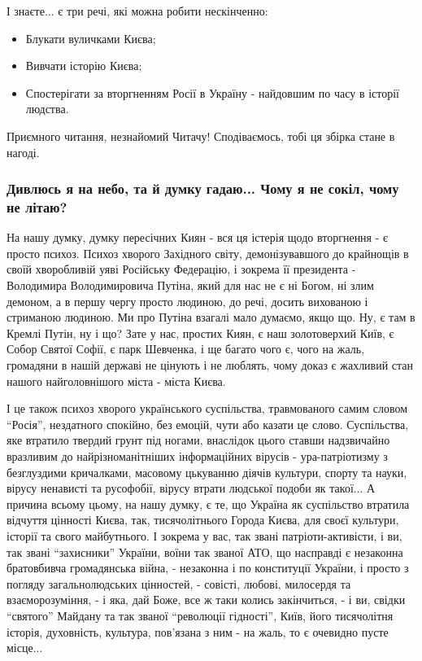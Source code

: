 І знаєте... є три речі, які можна робити нескінченно:

\begin{itemize} %
\item Блукати вуличками Києва;
\item Вивчати історію Києва;
\item Спостерігати за вторгненням Росії в Україну - найдовшим по часу в історії людства.
\end{itemize} %

Приємного читання, незнайомий Читачу! Сподіваємось, тобі ця збірка стане в нагоді.

\clearpage
\subsubsection{Дивлюсь я на небо, та й думку гадаю... Чому я не сокіл, чому не
літаю?}

На нашу думку, думку пересічних Киян - вся ця істерія щодо вторгнення - є
просто психоз. Психоз хворого Західного світу, демонізувавшого до крайнощів в
своїй хворобливій уяві Російську Федерацію, і зокрема її президента -
Володимира Володимировича Путіна, який для нас не є ні Богом, ні злим демоном,
а в першу чергу просто людиною, до речі, досить вихованою і стриманою людиною.
Ми про Путіна взагалі мало думаємо, якщо що. Ну, є там в Кремлі Путін, ну і що?
Зате у нас, простих Киян, є наш золотоверхий Київ, є Собор Святої Софії, є парк
Шевченка, і ще багато чого є, чого на жаль, громадяни в нашій державі не
цінують і не люблять, чому доказ є жахливий стан нашого найголовнішого міста -
міста Києва.

І це також психоз хворого українського суспільства, травмованого самим словом
\enquote{Росія}, нездатного спокійно, без емоцій, чути або казати це слово.
Суспільства, яке втратило твердий грунт під ногами, внаслідок цього ставши
надзвичайно вразливим до найрізноманітніших інформаційних вірусів -
ура-патріотизму з безглуздими кричалками, масовому цькуванню діячів культури,
спорту та науки, вірусу ненависті та русофобії, вірусу втрати людської подоби
як такої... А причина всьому цьому, на нашу думку, є те, що Україна як
суспільство втратила відчуття цінності Києва, так, тисячолітнього Города Києва,
для своєї культури, історії та свого майбутнього. І зокрема у вас, так звані
патріоти-активісти, і ви, так звані \enquote{захисники} України, воїни так
званої АТО, що насправді є незаконна братовбивча громадянська війна, -
незаконна і по конституції України, і просто з погляду загальнолюдських
цінностей, - совісті, любові, милосердя та взаєморозуміння, - і яка, дай Боже,
все ж таки колись закінчиться, - і ви, свідки \enquote{святого} Майдану та так
званої \enquote{революції гідності}, Київ, його тисячолітня історія,
духовність, культура, пов'язана з ним - на жаль, то є очевидно пусте місце...

